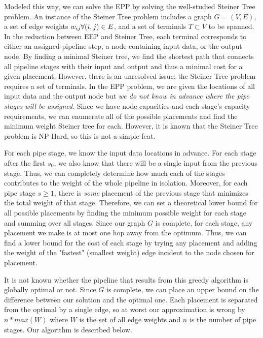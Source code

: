 \documentclass{article}
\newcommand{\foralle}[2]{\ensuremath{\forall (#1,#2) \in E }}
\begin{document}
	Modeled this way, we can solve the EPP by solving the well-studied Steiner Tree problem. An instance of the Steiner Tree problem includes a graph $G = (V,E)$, a set of edge weights $w_{ij} \space \foralle{i}{j}$, and a set of terminals $T \subset V$ to be spanned. In the reduction between EEP and Steiner Tree, each terminal corresponds to either an assigned pipeline step, a node containing input data, or the output node. By finding a minimal Steiner tree, we find the shortest path that connects all pipeline stages with their input and output and thus a minimal cost for a given placement. However, there is an unresolved issue: the Steiner Tree problem requires a set of terminals. In the EPP problem, we are given the locations of all input data and the output node but \textit{we do not know in advance where the pipe stages will be assigned}. Since we have node capacities and each stage's capacity requirements, we can enumerate all of the possible placements and find the minimum weight Steiner tree for each. However, it is known that the Steiner Tree problem is NP-Hard, so this is not a simple feat.
	
	For each pipe stage, we know the input data locations in advance. For each stage after the first $s_{0}$, we also know that there will be a single input from the previous stage. Thus, we can completely determine how much each of the stages contributes to the weight of the whole pipeline in isolation. Moreover, for each pipe stage $s \ge 1$, there is \textit{some} placement of the previous stage that minimizes the total weight of that stage. Therefore, we can set a theoretical lower bound for all possible placements by finding the minimum possible weight for each stage and summing over all stages. Since our graph $G$ is complete, for each stage, any placement we make is at most one hop away from the optimum. Thus, we can find a lower bound for the cost of each stage by trying any placement and adding the weight of the "fastest" (smallest weight) edge incident to the node chosen for placement.
	
	It is not known whether the pipeline that results from this greedy algorithm is globally optimal or not. Since $G$ is complete, we can place an upper bound on the difference between our solution and the optimal one. Each placement is separated from the optimal by a single edge, so at worst our approximation is wrong by $n * max(W)$ where $W$ is the set of all edge weights and $n$ is the number of pipe stages. Our algorithm is described below.
	
\end{document}
